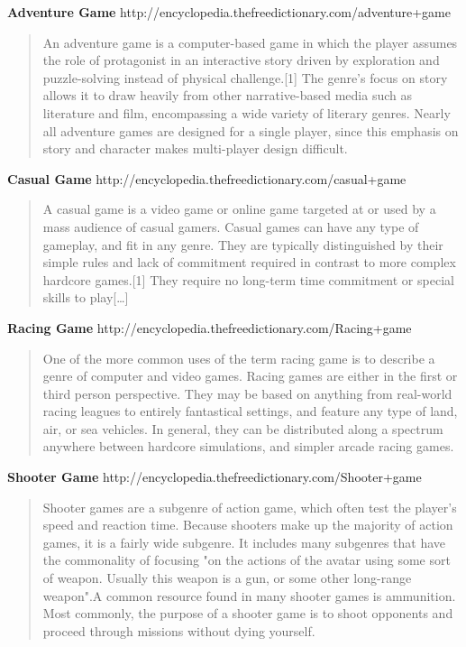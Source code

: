 \documentclass{article}
\begin{document}
\textbf{Adventure Game}		
	http://encyclopedia.thefreedictionary.com/adventure+game
\begin{quote}
An adventure game is a computer-based game in which the player assumes the role
of protagonist in an interactive story driven by exploration and puzzle-solving
instead of physical challenge.[1] The genre's focus on story allows it to draw
heavily from other narrative-based media such as literature and film,
encompassing a wide variety of literary genres. Nearly all adventure games are
designed for a single player, since this emphasis on story and character makes
multi-player design difficult.
\end{quote}

\textbf{Casual Game}		
	http://encyclopedia.thefreedictionary.com/casual+game
\begin{quote}
A casual game is a video game or online game targeted at or used by a mass
audience of casual gamers. Casual games can have any type of gameplay, and fit
in any genre. They are typically distinguished by their simple rules and lack of
commitment required in contrast to more complex hardcore games.[1] They require
no long-term time commitment or special skills to play[\ldots]
\end{quote}

\textbf{Racing Game}
	http://encyclopedia.thefreedictionary.com/Racing+game
\begin{quote}
One of the more common uses of the term racing game is to describe a genre of
computer and video games. Racing games are either in the first or third person
perspective. They may be based on anything from real-world racing leagues to
entirely fantastical settings, and feature any type of land, air, or sea
vehicles. In general, they can be distributed along a spectrum anywhere between
hardcore simulations, and simpler arcade racing games.
\end{quote}
\textbf{Shooter Game}
	http://encyclopedia.thefreedictionary.com/Shooter+game
\begin{quote}
Shooter games are a subgenre of action game, which often test the player's speed
and reaction time. Because shooters make up the majority of action games, it is
a fairly wide subgenre. It includes many subgenres that have the commonality of
focusing "on the actions of the avatar using some sort of weapon. Usually this
weapon is a gun, or some other long-range weapon".A common resource found in
many shooter games is ammunition. Most commonly, the purpose of a shooter
game is to shoot opponents and proceed through missions without dying yourself.
\end{quote}
	
\end{document}
